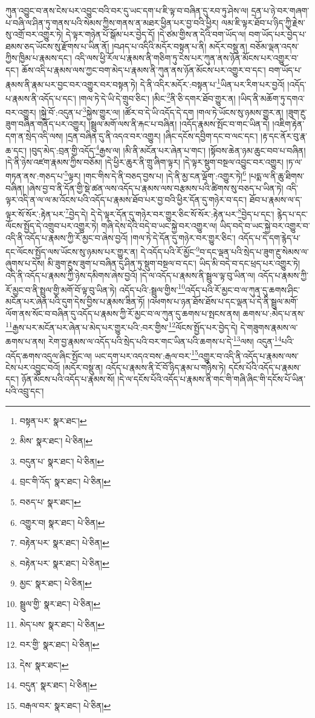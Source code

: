 ཀུན་འབྱུང་བ་ནས་ངེས་པར་འབྱུང་བའི་བར་དུ་ཡང་དག་པ་ཇི་ལྟ་བ་བཞིན་དུ་རབ་ཏུ་ཤེས་ལ། དྲན་པ་ཉེ་བར་གཞག་པ་བཞི་ལ་ཤིན་ཏུ་གནས་པའི་སེམས་ཀྱིས་གནས་ན་མཐར་ཕྱིན་པར་བྱ་བའི་ཕྱིར། ལམ་ཇི་ལྟར་ཐོབ་པ་ཉིད་ཀྱི་རྗེས་སུ་འགྲོ་བར་འགྱུར་ཏེ། དེ་ལྟར་གཉེན་པོ་སྒོམ་པར་བྱེད་དོ། །དེ་ཙམ་གྱིས་ན་དེའི་བག་ཡོད་ལ། བག་ཡོད་པར་བྱེད་པ་ཐམས་ཅད་ཡོངས་སུ་རྫོགས་པ་ཡིན་ནོ། །བཤད་པ་འདིའི་མདོར་བསྟན་པ་ནི། མདོར་བསྡུ་ན། བཅོམ་ལྡན་འདས་ཀྱིས་ཁྱིམ་པ་རྣམས་དང་། འདི་ལས་ཕྱི་རོལ་པ་རྣམས་ནི་གཅིག་ཏུ་ངེས་པར་ཀུན་ནས་ཉོན་མོངས་པར་འགྱུར་བ་དང་། ཆོས་འདི་པ་རྣམས་ལས་ཀྱང་བག་མེད་པ་རྣམས་ནི་ཀུན་ནས་ཉོན་མོངས་པར་འགྱུར་བ་དང་། བག་ཡོད་པ་རྣམས་ནི་རྣམ་པར་བྱང་བར་འགྱུར་བར་བསྟན་ཏེ། དེ་ནི་འདིར་མདོར་:བསྟན་པ་\footnote{བསྟན་པར་  སྣར་ཐང་། }ཡིན་པར་རིག་པར་བྱའོ། །འདོད་པ་རྣམས་ནི་འདོད་པ་དང་། །གལ་ཏེ་དེ་ཡི་དེ་གྲུབ་ཅིང་། །མིང་\footnote{མིས་  སྣར་ཐང་།  པེ་ཅིན། }ནི་ཅི་དགར་ཐོབ་གྱུར་ན། །ཡིད་ནི་མཆོག་ཏུ་དགའ་བར་འགྱུར། །སྐྱེ་བོ་:འདུན་པ་\footnote{བདུན་པ་  སྣར་ཐང་།  པེ་ཅིན། }སྐྱེས་གྱུར་ལ། །ཚོར་བ་དེ་ཡི་འདོད་དེ་དག །གལ་ཏེ་ཡོངས་སུ་ཉམས་གྱུར་ན། །ཟུག་རྔུ་ཟུག་བཞིན་གནོད་པར་འགྱུར། །སྦྲུལ་མགོ་ལས་ནི་རྐང་པ་བཞིན། །འདོད་རྣམས་སྤོང་བ་གང་ཡིན་དེ། །འཇིག་རྟེན་དག་ན་སྲེད་འདི་ལས། །དྲན་བཞིན་དུ་ནི་འདའ་བར་འགྱུར། །ཞིང་དངོས་དབྱིག་དང་བ་ལང་དང་། །རྟ་དང་ནོར་བུ་རྣ་ཆ་དང་། །བུད་མེད་:བྲན་གྱི་འདོད་\footnote{བྲང་གི་འོད་  སྣར་ཐང་།  པེ་ཅིན། }རྒྱས་ལ། །མི་ནི་མངོན་པར་ཞེན་པ་གང་། །སྟོབས་ཆེན་ཉམ་ཆུང་བབ་པ་བཞིན། །དེ་ནི་ཉེས་འཛག་རྣམས་ཀྱིས་བཅོམ། །དེ་ཕྱིར་ཆུར་ནི་གྲུ་ཞིག་ལྟར། །དེ་ལྟར་སྡུག་བསྔལ་འབྱུང་བར་འགྱུར། །ཏ་ལ་གཏན་ནས་:གཅད་པ་\footnote{བཅད་པ་  སྣར་ཐང་། }ལྟར། །གང་གིས་དེ་ནི་བཅད་བྱས་པ། །དེ་ནི་མྱ་ངན་ལྡོག་:འགྱུར་ཏེ།\footnote{འགྱུར་བ།  སྣར་ཐང་།  པེ་ཅིན། } །པདྨ་ལ་ནི་ཆུ་ཐིགས་བཞིན། །ཞེས་བྱ་བ་ནི་དོན་གྱི་སྡེ་ཚན་ལས་འདོད་པ་རྣམས་ལས་བརྩམས་པའི་ཚིགས་སུ་བཅད་པ་ཡིན་ཏེ། འདི་ལྟར་འདི་ན་ལ་ལ་མ་འོངས་པའི་འདོད་པ་རྣམས་ཐོབ་པར་བྱ་བའི་ཕྱིར་དོན་དུ་གཉེར་བ་དང་། ཐོབ་པ་རྣམས་ལ་ད་ལྟར་སོ་སོར་:རྟེན་པར་\footnote{བརྟེན་པར་  སྣར་ཐང་།  པེ་ཅིན། }བྱེད་དེ། དེ་དེ་ལྟར་དོན་དུ་གཉེར་བར་གྱུར་ཅིང་སོ་སོར་:རྟེན་པར་\footnote{བརྟེན་པར་  སྣར་ཐང་།  པེ་ཅིན། }བྱེད་པ་དང་། རྙེད་པ་དང་ལོངས་སྤྱོད་དེ་འགྲུབ་པར་འགྱུར་ཏེ། གཞི་དེས་དེའི་བདེ་བ་ཡང་སྐྱེ་བར་འགྱུར་ལ། ཡིད་བདེ་བ་ཡང་སྐྱེ་བར་འགྱུར་བ་འདི་ནི་འདོད་པ་རྣམས་ཀྱི་རོ་མྱང་བ་ཞེས་བྱའོ། །གལ་ཏེ་དེ་དོན་དུ་གཉེར་བར་གྱུར་ཅིང་། འདོད་པ་དེ་དག་རྙེད་པ་དང་ལོངས་སྤྱོད་ལས་ཡོངས་སུ་ཉམས་པར་གྱུར་ན། དེ་འདོད་པའི་རོ་མྱོང་\footnote{མྱང་  སྣར་ཐང་།  པེ་ཅིན། }བ་དང་ལྡན་པའི་སྲེད་པ་ཟུག་རྔུ་སེམས་ལ་ཞུགས་པ་དེས། མི་ཟུག་རྔུས་ཟུག་པ་བཞིན་དུ་ཤིན་ཏུ་སྡུག་བསྔལ་བ་དང་། ཡིད་མི་བདེ་བ་དང་ཕྲད་པར་འགྱུར་ཏེ། འདི་ནི་འདོད་པ་རྣམས་ཀྱི་ཉེས་དམིགས་ཞེས་བྱའོ། །དེ་ལ་འདོད་པ་རྣམས་ནི་སྦྲུལ་ལྟ་བུ་ཡིན་ལ། འདོད་པ་རྣམས་ཀྱི་རོ་མྱང་བ་ནི་སྤྲུལ་གྱི་མགོ་བོ་ལྟ་བུ་ཡིན་ཏེ། འདོད་པའི་:སྦྲུལ་གྱིས་\footnote{སྦྲུལ་གྱི་  སྣར་ཐང་།  པེ་ཅིན། }འདོད་པའི་རོ་མྱང་བ་ལ་ཀུན་དུ་ཆགས་ཤིང་མངོན་པར་ཞེན་པའི་དུག་དེས་བྱིས་པ་རྣམས་ཟིན་ཏོ། །འཕགས་པ་ཉན་ཐོས་ཐོས་པ་དང་ལྡན་པ་དེ་ནི་སྦྲུལ་མགོ་ལོག་ནས་སོང་བ་བཞིན་དུ་འདོད་པ་རྣམས་ཀྱི་རོ་མྱང་བ་ལ་ཀུན་དུ་ཆགས་པ་སྤངས་ནས། ཆགས་པ་:མེད་པ་ནས་\footnote{མེད་པས་  སྣར་ཐང་།  པེ་ཅིན། }རྒྱས་པར་མངོན་པར་ཞེན་པ་མེད་པར་གྱུར་པའི་:བར་གྱིས་\footnote{བར་གྱི་  སྣར་ཐང་།  པེ་ཅིན། }ལོངས་སྤྱོད་པར་བྱེད་དེ། དེ་གཟུགས་རྣམས་ལ་ཆགས་པ་ནས། རེག་བྱ་རྣམས་ལ་འདོད་པའི་སྲེད་པའི་བར་གང་ཡིན་པའི་ཆགས་པ་དེ་\footnote{དེས་  སྣར་ཐང་། }ལས། འདུན་\footnote{བདུན་  སྣར་ཐང་།  པེ་ཅིན། }པའི་འདོད་ཆགས་འདུལ་ཞིང་སྤོང་ལ། ཡང་དག་པར་འདའ་བས་:རྒལ་བར་\footnote{བརྒལ་བར་  སྣར་ཐང་།  པེ་ཅིན། }འགྱུར་བ་འདི་ནི་འདོད་པ་རྣམས་ལས་ངེས་པར་འབྱུང་བའོ། །མདོར་བསྡུ་ན། འདོད་པ་རྣམས་ནི་ངོ་བོ་ཉིད་རྣམ་པ་གཉིས་ཏེ། དངོས་པོའི་འདོད་པ་རྣམས་དང་། ཉོན་མོངས་པའི་འདོད་པ་རྣམས་སོ། །དེ་ལ་དངོས་པོའི་འདོད་པ་རྣམས་ནི་གང་གི་གཞི་ཞིང་གི་དངོས་པོ་ཡིན་པའི་འབྲུ་དང་། 